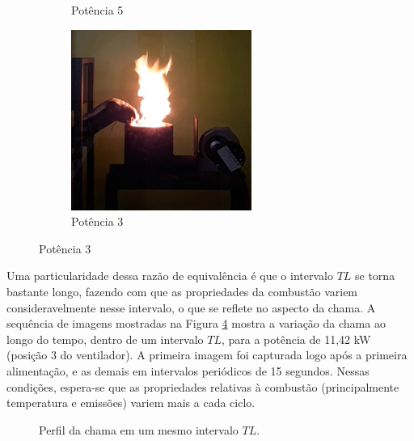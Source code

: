\begin{figure}[!ht]
\begin{subfigure}[b]{0.3\textwidth}
         \caption{Potência 5}
         \label{fig:pot5}
     \end{subfigure}
     \hfill
     \begin{subfigure}[b]{0.3\textwidth}
         \centering
         \includegraphics[width=\textwidth]{Textuais/results/0,7posicao3.png}
         \caption{Potência 3}
         \label{fig:pot3}
     \end{subfigure}
\end{figure}

Uma particularidade dessa razão de equivalência é que o intervalo $TL$ se torna bastante longo, fazendo com que as propriedades da combustão variem consideravelmente nesse intervalo, o que se reflete no aspecto da chama. A sequência de imagens mostradas na Figura \ref{fig:perfilchama3_0,7} mostra a variação da chama ao longo do tempo, dentro de um intervalo $TL$, para a potência de 11,42 kW (posição 3 do ventilador). A primeira imagem foi capturada logo após a primeira alimentação, e as demais em intervalos periódicos de 15 segundos. Nessas condições, espera-se que as propriedades relativas à combustão (principalmente temperatura e emissões) variem mais a cada ciclo.  

\begin{figure}[!ht]
	\centering
	\caption{Perfil da chama em um mesmo intervalo $TL$.}
	\label{fig:perfilchama3_0,7}
\end{figure}

